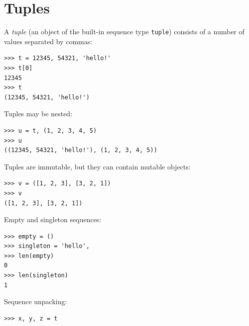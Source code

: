 \documentclass[8pt,a4paper,compress,handout]{beamer}
\begin{document}
\section{Tuples}
\begin{frame}[fragile]
A \emph{tuple} (an object of the built-in sequence type \lstinline{tuple}) consists of a number of values separated by commas:
\begin{lstlisting}[language={}]
>>> t = 12345, 54321, 'hello!'
>>> t[0]
12345
>>> t
(12345, 54321, 'hello!')
\end{lstlisting}

\bigskip

Tuples may be nested:
\begin{lstlisting}[language={}]
>>> u = t, (1, 2, 3, 4, 5)
>>> u
((12345, 54321, 'hello!'), (1, 2, 3, 4, 5))
\end{lstlisting}

\bigskip

Tuples are immutable, but they can contain mutable objects:
\begin{lstlisting}[language={}]
>>> v = ([1, 2, 3], [3, 2, 1])
>>> v
([1, 2, 3], [3, 2, 1])
\end{lstlisting}

\bigskip

Empty and singleton sequences:
\begin{lstlisting}[language={}]
>>> empty = ()
>>> singleton = 'hello', 
>>> len(empty)
0
>>> len(singleton)
1
\end{lstlisting}

\bigskip

Sequence unpacking:
\begin{lstlisting}[language={}]
>>> x, y, z = t
\end{lstlisting}
\end{frame}
\end{document}
